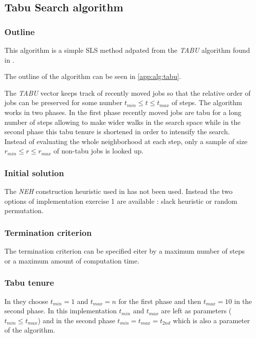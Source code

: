 \subsection{Tabu Search algorithm}
\label{impl:tabu}

\subsubsection{Outline}

This algorithm is a simple SLS method adpated from the \emph{TABU} algorithm found in \cite{santostabu}.

The outline of the algorithm can be seen in \ref{app:alg:tabu}.

The \emph{TABU} vector keeps track of recently moved jobs so that the relative order of jobs can be preserved for some number $t_{min} \leq t \leq t_{max}$ of steps. The algorithm works in two phases. In the first phase recently moved jobs are tabu for a long number of steps allowing to make wider walks in the search space while in the second phase this tabu tenure is shortened in order to intensify the search. Instead of evaluating the whole neighborhood at each step, only a sample of size $r_{min} \leq r \leq r_{max}$ of non-tabu jobs is looked up.

\subsubsection{Initial solution}

The \emph{NEH} construction heuristic used in \cite{santostabu} has not been used. Instead the two options of implementation exercise 1 are available : slack heuristic or random permutation.


\subsubsection{Termination criterion}

The termination criterion can be specified eiter by a maximum number of steps or a maximum amount of computation time.

\subsubsection{Tabu tenure}

In \cite{santostabu} they choose $t_{min} = 1$ and $t_{max} = n$ for the first phase and then $t_{max} = 10$ in the second phase. In this implementation $t_{min}$ and $t_{max}$ are left as parameters ($t_{min} \leq t_{max}$) and in the second phase $t_{min} = t_{max} = t_{2nd}$ which is also a parameter of the algorithm.

